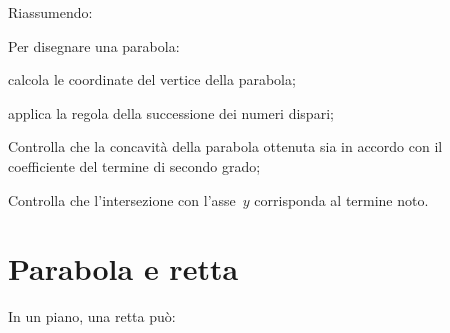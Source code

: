 Riassumendo:
\begin{procedura}
 Per disegnare una parabola:
 \begin{itemize*}
  \item calcola le coordinate del vertice della parabola;
  \item applica la regola della successione dei numeri dispari;
  \item Controlla che la concavità della parabola ottenuta sia in accordo con
   il coefficiente del termine di secondo grado;
  \item Controlla che l'intersezione con l'asse~\(y\) corrisponda al termine
  noto.
 \end{itemize*}
\end{procedura}


\section{Parabola e retta}
\label{sec:parabola_parabolaretta}

In un piano, una retta può:

